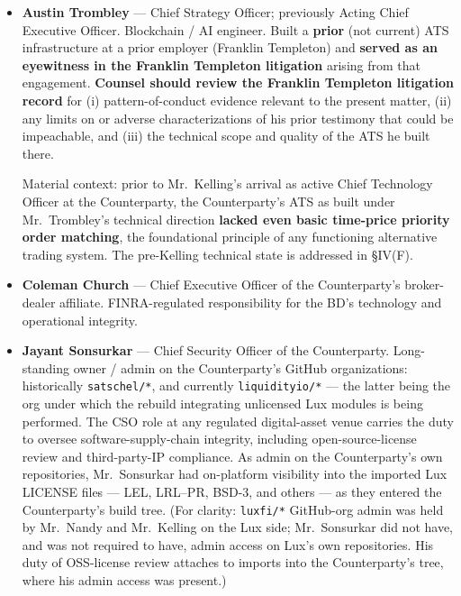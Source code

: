 \documentclass[11pt,letterpaper]{article}
\begin{document}
\begin{itemize}[leftmargin=1.5em,itemsep=0.2em]
the Counterparty's representations to investors and regulators
regarding IP ownership and licensing.
\item \textbf{Austin Trombley} --- Chief Strategy Officer; previously
Acting Chief Executive Officer. Blockchain / AI engineer. Built a
\textbf{prior} (not current) ATS infrastructure at a prior employer
(Franklin Templeton) and \textbf{served as an eyewitness in the
Franklin Templeton litigation} arising from that engagement.
\textbf{Counsel should review the Franklin Templeton litigation
record} for (i) pattern-of-conduct evidence relevant to the present
matter, (ii) any limits on or adverse characterizations of his prior
testimony that could be impeachable, and (iii) the technical scope and
quality of the ATS he built there.

Material context: prior to Mr.\ Kelling's arrival as active Chief
Technology Officer at the Counterparty, the Counterparty's ATS as
built under Mr.\ Trombley's technical direction \textbf{lacked even
basic time-price priority order matching}, the foundational principle
of any functioning alternative trading system. The pre-Kelling
technical state is addressed in \S IV(F).
\item \textbf{Coleman Church} --- Chief Executive Officer of the
Counterparty's broker-dealer affiliate. FINRA-regulated responsibility
for the BD's technology and operational integrity.
\item \textbf{Jayant Sonsurkar} --- Chief Security Officer of the
Counterparty. Long-standing owner / admin on the Counterparty's GitHub
organizations: historically \texttt{satschel/*}, and currently
\texttt{liquidityio/*} --- the latter being the org under which the
rebuild integrating unlicensed Lux modules is being performed. The
CSO role at any regulated digital-asset venue carries the duty to
oversee software-supply-chain integrity, including open-source-license
review and third-party-IP compliance. As admin on the Counterparty's
own repositories, Mr.\ Sonsurkar had on-platform visibility into the
imported Lux LICENSE files --- LEL, LRL--PR, BSD-3, and others ---
as they entered the Counterparty's build tree. (For clarity:
\texttt{luxfi/*} GitHub-org admin was held by Mr.\ Nandy and Mr.\
Kelling on the Lux side; Mr.\ Sonsurkar did not have, and was not
required to have, admin access on Lux's own repositories. His
duty of OSS-license review attaches to imports into the
Counterparty's tree, where his admin access was present.)
\end{itemize}
\end{document}
